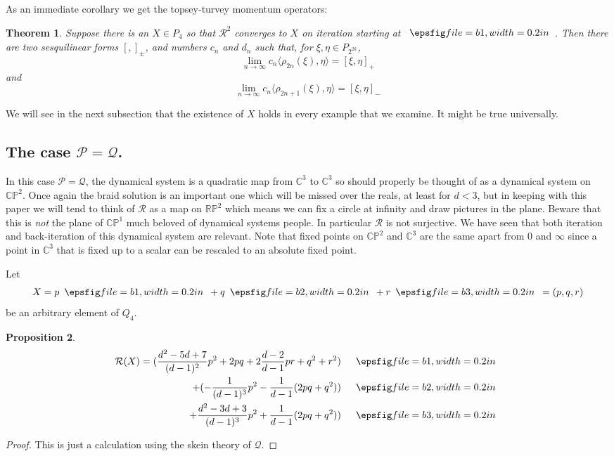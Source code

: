 \documentclass[11pt]{amsart}
\newtheorem{theorem}{Theorem}[section]
\newtheorem{proposition}[theorem]{Proposition}
\newcommand{\1}{\mathcal I}
\newcommand{\5}{\vskip 5pt}
\begin{document}
  As an immediate corollary we get the topsey-turvey momentum operators:
  \begin{theorem}Suppose there is an $X\in P_4$ so that $\mathcal R^2$ converges to $X$ on iteration starting at $\BA$.
  Then there are two sesquilinear forms $[,]_\pm$, and numbers $c_n$ and $d_n$ such that, for $\xi,\eta\in P_{2^{2k}}$,
  $$\lim_{n\rightarrow \infty} c_n\langle  \rho_{2n}(\xi),\eta\rangle=[\xi,\eta]_+$$ and
  $$\lim_{n\rightarrow \infty} c_n\langle  \rho_{2n+1}(\xi),\eta\rangle=[\xi,\eta]_-$$
  \end{theorem}
  We will see in the next subsection that the existence of $X$ holds in every example that we examine. It might be true universally.
 \subsection{The case $\mathcal P=\mathcal Q$.}
 
 In this case $\mathcal P=\mathcal Q$, the dynamical system is a quadratic map from $\mathbb C^3$ to $\mathbb C^3$ so
 should properly be thought of as a dynamical system on $\mathbb C\mathbb P^2$.  Once
 again the braid solution is an important one which will be missed over the reals, at least for $d<3$, but in keeping with this paper we will tend to 
 think of $\mathcal R$ as a map on $\mathbb R \mathbb P^2$ which means we can fix a circle at infinity and draw pictures in the plane. 
 Beware that this is \emph{not} the plane of $\mathbb C \mathbb P^1$ much beloved of dynamical systems people. In
 particular $\mathcal R$ is not surjective. We have seen that both
 iteration and back-iteration of this dynamical system are relevant. Note that fixed points on $\mathbb C\mathbb P^2$
 and $\mathbb C^3$ are the same apart from $0$ and $\infty$ since a point in $\mathbb C^3$ that is fixed up to a scalar
 can be rescaled to an absolute fixed point.
 
Let $$X=p\BA+q\BB+r\BC=(p,q,r)$$ be an arbitrary element of $Q_4$.
 \begin{proposition}

\begin{align*}\mathcal R(X)=(\frac{d^{2} - 5d + 7}{(d - 1)^2}p^2 + 2pq + 2\frac{d - 2}{d - 1}pr + 
 q^2 + r^2)\quad & \BA \\
 +(-\frac{1}{(d - 1)^3} p^2- \frac{1}{d-1}(2pq + q^2)) \quad&  \BB \\
 +\frac{d^2-3d+3}{(d-1)^3}p^2 + \frac{1}{d-1}(2pq + q^2))\quad & \BC   \end{align*}

 \end{proposition}
 \begin{proof}
 This is just a calculation using the skein theory of $\mathcal Q$.\end{proof}
 
\end{document}
